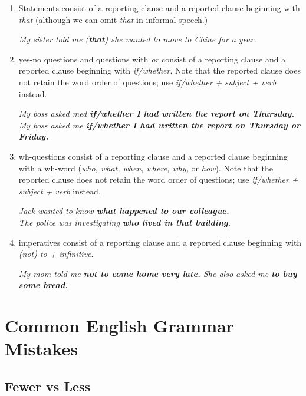 \documentclass[hidelinks,10pt,a4paper]{article}
\begin{document}
\begin{enumerate}[label=(\alph*)]
	\item Statements consist of a reporting clause and a reported clause beginning with \textit{that} (although we can omit \textit{that} in informal speech.)
		\begin{center}
			\textit{My sister told me (\textbf{that}) she wanted to move to Chine for a year.}
		\end{center}

	\item yes-no questions and questions with \textit{or} consist of a reporting clause and a reported clause beginning with \textit{if/whether}. Note that the reported clause does not retain the word order of questions; use \textit{if/whether + subject + verb} instead.
		\begin{center}
			\textit{My boss asked med \textbf{if/whether I had written the report on Thursday.}}\\
			\textit{My boss asked me \textbf{if/whether I had written the report on Thursday or Friday.}}
		\end{center}

	\item wh-questions consist of a reporting clause and a reported clause beginning with a wh-word (\textit{who, what, when, where, why,} or \textit{how}). Note that the reported clause does not retain the word order of questions; use \textit{if/whether + subject + verb} instead.
		\begin{center}
			\textit{Jack wanted to know \textbf{what happened to our colleague.}}\\
			\textit{The police was investigating \textbf{who lived in that building.} }
		\end{center}

	\item imperatives consist of a reporting clause and a reported clause beginning with \textit{(not) to + infinitive}.
		\begin{center}
			\textit{My mom told me \textbf{not to come home very late.} She also asked me \textbf{to buy some bread.} }
		\end{center}
\end{enumerate}

\section{Common English Grammar Mistakes}
\subsection{Fewer vs Less}
\end{document}
